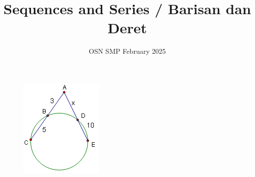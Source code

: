 \documentclass[12pt]{scrartcl}
\title{Sequences and Series / Barisan dan Deret}
\date{OSN SMP \textbar 3 February 2025}
\begin{document}
\maketitle
    \begin{figure}[H]
        \centering
        \includegraphics[scale=0.4]{0Figure/Popprob1.png}
    \end{figure}
\end{document}
